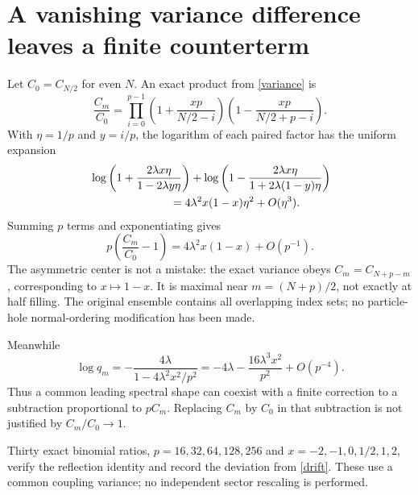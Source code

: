\documentclass[11pt,a4paper]{article}
\begin{document}
\section{A vanishing variance difference leaves a finite counterterm}
Let $C_0=C_{N/2}$ for even $N$. An exact product from
\eqref{variance} is
\begin{equation}
 \frac{C_m}{C_0}=
 \prod_{i=0}^{p-1}
 \left(1+\frac{xp}{N/2-i}\right)
 \left(1-\frac{xp}{N/2+p-i}\right).
\end{equation}
With $\eta=1/p$ and $y=i/p$, the logarithm of each paired
factor has the uniform expansion
\begin{align}
 &\log\left(1+\frac{2\lambda x\eta}{1-2\lambda y\eta}\right)
 +\log\left(1-\frac{2\lambda x\eta}{1+2\lambda(1-y)\eta}\right)
 \notag\\
 &\hspace{25mm}=4\lambda^2x(1-x)\eta^2+O(\eta^3).
\end{align}
Summing $p$ terms and exponentiating gives
\begin{equation}
 \boxed{\quad p\left(\frac{C_m}{C_0}-1\right)
 =4\lambda^2x(1-x)+O(p^{-1}).\quad}\label{drift}
\end{equation}
The asymmetric center is not a mistake: the exact variance obeys
$C_m=C_{N+p-m}$, corresponding to $x\mapsto1-x$.
It is maximal near $m=(N+p)/2$, not exactly at half filling.
The original ensemble contains all overlapping index sets; no
particle-hole normal-ordering modification has been made.

Meanwhile
\begin{equation}
 \log q_m=-\frac{4\lambda}{1-4\lambda^2x^2/p^2}
 =-4\lambda-\frac{16\lambda^3x^2}{p^2}+O(p^{-4}).
\end{equation}
Thus a common leading spectral shape can coexist with a finite
correction to a subtraction proportional to $pC_m$.
Replacing $C_m$ by $C_0$ in that subtraction is not justified by
$C_m/C_0\to1$.

Thirty exact binomial ratios, $p=16,32,64,128,256$ and
$x=-2,-1,0,1/2,1,2$, verify the reflection identity and record
the deviation from \eqref{drift}. These use a common coupling
variance; no independent sector rescaling is performed.

\newpage
\end{document}
